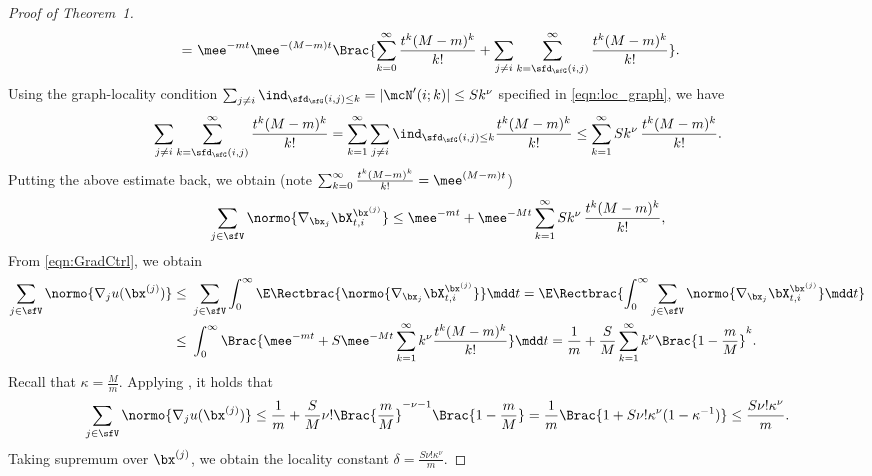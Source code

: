 \documentclass[11pt]{article}
\begin{document}
\begin{proof}[Proof of Theorem~1]
\begin{equation}
\begin{split}
    =~& \mee^{-mt} \mee^{-(M-m) t} \Brac{ \sum_{ k = 0 }^\infty \frac{t^k(M-m)^k}{k!} + \sum_{j\neq i} \sum_{ k = \sfd_\sfG(i,j) }^\infty \frac{t^k(M-m)^k}{k!} }.
\end{split}
\end{equation}
Using the graph-locality condition $\sum_{j \neq i} \ind_{ \sfd_\sfG(i,j) \le k }  = |\mcN'(i;k)| \le S k^\nu $ specified in \eqref{eqn:loc_graph}, we have
\begin{equation}
    \sum_{j\neq i} \sum_{ k = \sfd_\sfG(i,j) }^\infty \frac{t^k(M-m)^k}{k!} = \sum_{k = 1}^\infty \sum_{j \neq i} \ind_{ \sfd_\sfG(i,j) \le k }  \frac{t^k(M-m)^k}{k!} \le \sum_{k = 1}^\infty S k^\nu\,  \frac{t^k(M-m)^k}{k!}.
\end{equation}
Putting the above estimate back, we obtain (note $  \sum_{ k = 0 }^\infty \frac{t^k(M-m)^k}{k!} = \mee^{(M-m) t}$)
\begin{equation}
\begin{split}
    \sum_{j\in \sfV} \normo{ \nabla_{\bx_j} \bX_{t,i}^{\bx^{(j)}} } \le \mee^{-mt} + \mee^{-Mt} \sum_{k = 1}^\infty S k^\nu\,  \frac{t^k(M-m)^k}{k!},
\end{split}
\end{equation}
From \eqref{eqn:GradCtrl}, we obtain
\begin{equation}
\begin{split}
    \sum_{j\in \sfV} \normo{\nabla_j u(\bx^{(j)})} \le~& \sum_{j\in \sfV} \int_0^\infty \E \Rectbrac{ \normo{\nabla_{\bx_j} \bX_{t,i}^{\bx^{(j)}}} } \mdd t = \E \Rectbrac{ \int_0^\infty \sum_{j\in \sfV} \normo{\nabla_{\bx_j} \bX_{t,i}^{\bx^{(j)}}} \mdd t } \\
    \le~& \int_0^\infty \Brac{ \mee^{-mt} + S \mee^{-Mt} \sum_{k=1}^\infty k^\nu  \frac{t^k(M-m)^k}{k!} } \mdd t = \frac{1}{m} + \frac{S}{M} \sum_{k=1}^\infty k^\nu \Brac{ 1 - \frac{m}{M} }^k. 
\end{split}
\end{equation}
Recall that $\kappa = \frac{M}{m}$. Applying , it holds that
\begin{equation}
    \sum_{j\in \sfV} \normo{ \nabla_j u(\bx^{(j)})} \le \frac{1}{m} + \frac{S}{M} \nu! \Brac{\frac{m}{M}}^{-\nu-1} \Brac{ 1 - \frac{m}{M} } = \frac{1}{m} \Brac{ 1 + S \nu! \kappa^\nu  (1-\kappa^{-1})  } \le \frac{S \nu! \kappa^\nu}{m}.
\end{equation}
Taking supremum over $\bx^{(j)}$, we obtain the locality constant $\delta = \frac{S \nu! \kappa^\nu}{m}$.
\end{proof}
\end{document}
